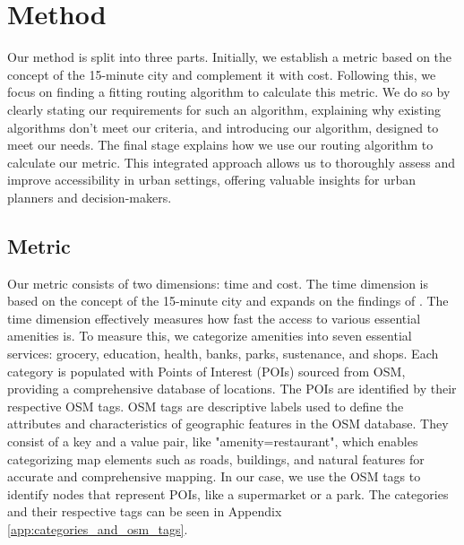 \clearpage
\section{Method}
\label{sec:method}

Our method is split into three parts.
Initially, we establish a metric based on the concept of the 15-minute city and complement it with cost.
Following this, we focus on finding a fitting routing algorithm to calculate this metric.
We do so by clearly stating our requirements for such an algorithm, explaining why existing algorithms don't meet our criteria, and introducing our algorithm, designed to meet our needs. 
The final stage explains how we use our routing algorithm to calculate our metric. 
This integrated approach allows us to thoroughly assess and improve accessibility in urban settings, offering valuable insights for urban planners and decision-makers.

\subsection{Metric}
\label{subsec:metric}

Our metric consists of two dimensions: time and cost.
The time dimension is based on the concept of the 15-minute city and expands on the findings of .
The time dimension effectively measures how fast the access to various essential amenities is.
To measure this, we categorize amenities into seven essential services: grocery, education, health, banks, parks, sustenance, and shops.
Each category is populated with Points of Interest (POIs) sourced from OSM, providing a comprehensive database of locations.
The POIs are identified by their respective OSM tags.
OSM tags are descriptive labels used to define the attributes and characteristics of geographic features in the OSM database. 
They consist of a key and a value pair, like "amenity=restaurant", which enables categorizing map elements such as roads, buildings, and natural features for accurate and comprehensive mapping.
In our case, we use the OSM tags to identify nodes that represent POIs, like a supermarket or a park.
The categories and their respective tags can be seen in Appendix \ref{app:categories_and_osm_tags}.


